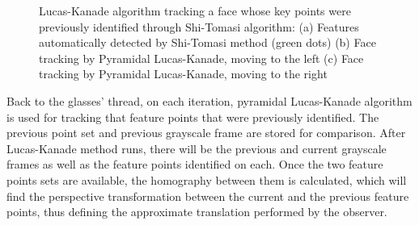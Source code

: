 \documentclass[msc, a4paper, classic, en]{ufbathesis}
\begin{document}
\begin{figure}
\centering
{}
\caption{Lucas-Kanade algorithm tracking a face whose key points were previously identified through Shi-Tomasi algorithm: (a) Features automatically detected by Shi-Tomasi method (green dots) (b) Face tracking by Pyramidal Lucas-Kanade, moving to the left (c) Face tracking by Pyramidal Lucas-Kanade, moving to the right}
\label{fig:lk}
\end{figure}

Back to the glasses' thread, on each iteration, pyramidal Lucas-Kanade algorithm is used for tracking that feature points that were previously identified. The previous point set and previous grayscale frame are stored for comparison. After Lucas-Kanade method runs, there will be the previous and current grayscale frames as well as the feature points identified on each. Once the two feature points sets are available, the homography between them is calculated, which will find the perspective transformation between the current and the previous feature points, thus defining the approximate translation performed by the observer.
\end{document}
